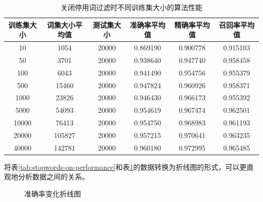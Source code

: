 \documentclass[UTF8,zihao=-4]{ctexart}
\begin{document}
	\begin{table}[H]
		\centering
		\caption{关闭停用词过滤时不同训练集大小的算法性能}
		\label{tab:stopwords-off-performance}
		\begin{tabular}{|c|c|c|c|c|c|}
			\hline
			训练集大小&词集大小平均值&测试集大小&准确率平均值&精确率平均值&召回率平均值\\
			\hline
			10&1054&20000&0.869190&0.900778&0.915103\\
			\hline
			50&3701&20000&0.938640&0.947740&0.958458\\
			\hline
			100&6043&20000&0.941490&0.954756&0.955379\\
			\hline
			500&15460&20000&0.947824&0.960926&0.958371\\
			\hline
			1000&23826&20000&0.946430&0.966173&0.955392\\
			\hline
			5000&54093&20000&0.954619&0.967474&0.962501\\
			\hline
			10000&76413&20000&0.954750&0.968983&0.961193\\
			\hline
			20000&105827&20000&0.957215&0.970641&0.963235\\
			\hline
			40000&142781&20000&0.960180&0.972995&0.965485\\
			\hline
		\end{tabular}
	\end{table}

	将表\ref{tab:stopwords-on-performance}和表\ref{tab:stopwords-off-performance}的数据转换为折线图的形式，可以更直观地分析数据之间的关系。
	
	\begin{figure}[H]
		\centering
	\caption{准确率变化折线图}	\label{fig:accuracy-axis}
	\end{figure}
\end{document}
